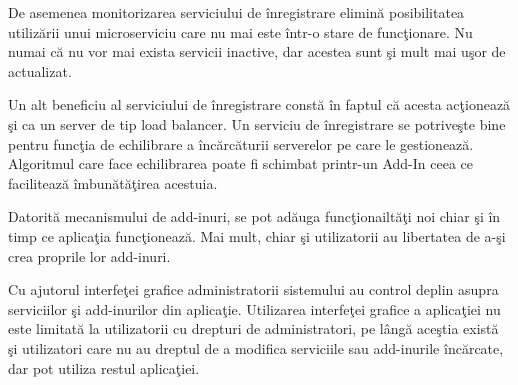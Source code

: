\documentclass[a4paper,12pt]{report}
\begin{document}
De asemenea monitorizarea serviciului de \^inregistrare elimin\u a posibilitatea 
utiliz\u arii unui microserviciu care nu mai este \^intr-o stare de func\c tionare.
Nu numai c\u a nu vor mai exista servicii inactive, dar acestea sunt  \c si mult mai 
u\c sor de actualizat. 

Un alt beneficiu al serviciului de \^inregistrare const\u a \^in faptul c\u a acesta
ac\c tioneaz\u a \c si ca un server de tip load balancer.
Un serviciu de \^inregistrare se potrive\c ste bine pentru func\c tia de echilibrare a \^inc\u arc\u aturii
serverelor pe care le gestioneaz\u a. Algoritmul care face echilibrarea poate fi 
schimbat printr-un Add-In ceea ce faciliteaz\u a \^imbun\u at\u a\c tirea acestuia.

Datorit\u a mecanismului de add-inuri, se pot ad\u auga func\c tionailt\u a\c ti noi
chiar \c si \^in timp ce aplica\c tia func\c tioneaz\u a. Mai mult,
chiar \c si utilizatorii au libertatea de a-\c si crea proprile lor add-inuri. 

Cu ajutorul interfe\c tei grafice administratorii sistemului au control deplin 
asupra serviciilor \c si add-inurilor din aplica\c tie. Utilizarea interfe\c tei grafice 
a aplica\c tiei nu este limitat\u a la utilizatorii cu drepturi de administratori, 
pe l\^ang\u a ace\c stia exist\u a \c si utilizatori care nu au dreptul de a modifica serviciile 
sau add-inurile \^inc\u arcate, dar pot utiliza restul aplica\c tiei.

\nocite{BrokerMsdn}
\printbibliography
\end{document}
